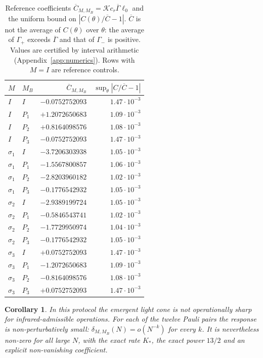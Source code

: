 \documentclass[11pt]{amsart}
\newtheorem{corollary}[theorem]{Corollary}
\theoremstyle{definition}
\theoremstyle{remark}
\newcommand{\cK}{\mathcal{K}}
\begin{document}
\begin{table}[t]
\centering
\small
\begin{tabular}{llrr}
\toprule
$M$ & $M_B$ & $\overline C_{M,M_B}$ & $\sup_\theta|C/\overline C-1|$\\
\midrule
$I$ & $I$ & $-0.0752752093$ & $1.47\cdot10^{-3}$\\
$I$ & $P_1$ & $+1.2072650683$ & $1.09\cdot10^{-3}$\\
$I$ & $P_2$ & $+0.8164098576$ & $1.08\cdot10^{-3}$\\
$I$ & $P_3$ & $-0.0752752093$ & $1.47\cdot10^{-3}$\\
$\sigma_1$ & $I$ & $-3.7206303938$ & $1.05\cdot10^{-3}$\\
$\sigma_1$ & $P_1$ & $-1.5567800857$ & $1.06\cdot10^{-3}$\\
$\sigma_1$ & $P_2$ & $-2.8203960182$ & $1.02\cdot10^{-3}$\\
$\sigma_1$ & $P_3$ & $-0.1776542932$ & $1.05\cdot10^{-3}$\\
$\sigma_2$ & $I$ & $-2.9389199724$ & $1.05\cdot10^{-3}$\\
$\sigma_2$ & $P_1$ & $-0.5846543741$ & $1.02\cdot10^{-3}$\\
$\sigma_2$ & $P_2$ & $-1.7729950974$ & $1.04\cdot10^{-3}$\\
$\sigma_2$ & $P_3$ & $-0.1776542932$ & $1.05\cdot10^{-3}$\\
$\sigma_3$ & $I$ & $+0.0752752093$ & $1.47\cdot10^{-3}$\\
$\sigma_3$ & $P_1$ & $-1.2072650683$ & $1.09\cdot10^{-3}$\\
$\sigma_3$ & $P_2$ & $-0.8164098576$ & $1.08\cdot10^{-3}$\\
$\sigma_3$ & $P_3$ & $+0.0752752093$ & $1.47\cdot10^{-3}$\\
\bottomrule
\end{tabular}
\caption{Reference coefficients $\overline C_{M,M_B}=\cK c_r\overline\Gamma\ell_0$
and the uniform bound on $|C(\theta)/\overline C-1|$.  $\overline C$ is not
the average of $C(\theta)$ over $\theta$: the average of $\Gamma_+$ exceeds
$\overline\Gamma$ and that of $\Gamma_-$ is positive.  Values are
certified by interval arithmetic (Appendix~\ref{app:numerics}).  Rows with
$M=I$ are reference controls.}
\label{tab:C}
\end{table}

\begin{corollary}\label{cor:suppressed}
In this protocol the emergent light cone is not operationally sharp for
infrared-admissible operations.  For each of the twelve Pauli pairs the response is
non-perturbatively small: $\delta_{M,M_B}(N)=o(N^{-k})$ for every $k$.  It is
nevertheless non-zero for all large $N$, with the exact rate $K_*$, the exact
power $13/2$ and an explicit non-vanishing coefficient.
\end{corollary}
\end{document}
